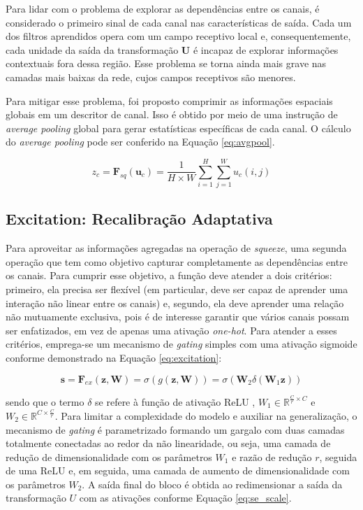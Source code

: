 Para lidar com o problema de explorar as dependências entre os canais, é considerado o primeiro sinal de cada canal nas características de saída. Cada um dos filtros aprendidos opera com um campo receptivo local e, consequentemente, cada unidade da saída da transformação $\mathbf{U}$ é incapaz de explorar informações contextuais fora dessa região. Esse problema se torna ainda mais grave nas camadas mais baixas da rede, cujos campos receptivos são menores.

Para mitigar esse problema, foi proposto comprimir as informações espaciais globais em um descritor de canal. Isso é obtido por meio de uma instrução de \textit{average pooling} global para gerar estatísticas específicas de cada canal. O cálculo do \textit{average pooling} pode ser conferido na Equação \ref{eq:avgpool}.

\begin{equation}
z_c = \mathbf{F}_{sq}(\mathbf{u}_c) = \frac{1}{H \times W} \sum_{i=1}^{H} \sum_{j=1}^{W} u_c(i, j)
\label{eq:avgpool}
\end{equation}

\subsection{Excitation: Recalibração Adaptativa}
\label{subsec:excitation}

Para aproveitar as informações agregadas na operação de \textit{squeeze}, uma segunda operação que tem como objetivo capturar completamente as dependências entre os canais. Para cumprir esse objetivo, a função deve atender a dois critérios: primeiro, ela precisa ser flexível (em particular, deve ser capaz de aprender uma interação não linear entre os canais) e, segundo, ela deve aprender uma relação não mutuamente exclusiva, pois é de interesse garantir que vários canais possam ser enfatizados, em vez de apenas uma ativação \textit{one-hot}. Para atender a esses critérios, emprega-se um mecanismo de \textit{gating} simples com uma ativação sigmoide conforme demonstrado na Equação \ref{eq:excitation}:

\begin{equation}
\mathbf{s} = \mathbf{F}_{ex}(\mathbf{z}, \mathbf{W}) = \sigma(g(\mathbf{z}, \mathbf{W})) = \sigma(\mathbf{W}_2 \delta(\mathbf{W}_1 \mathbf{z}))
\label{eq:excitation}
\end{equation}

\noindent sendo que o termo $\delta$ se refere à função de ativação ReLU \cite{nairRectifiedLinearUnits}, $W_1 \in \mathbb{R}^{\frac{C}{r} \times C}$ e $W_2 \in \mathbb{R}^{C \times \frac{C}{r}}$. Para limitar a complexidade do modelo e auxiliar na generalização, o mecanismo de \textit{gating} é parametrizado formando um gargalo com duas camadas totalmente conectadas ao redor da não linearidade, ou seja, uma camada de redução de dimensionalidade com os parâmetros $W_1$ e razão de redução $r$, seguida de uma ReLU e, em seguida, uma camada de aumento de dimensionalidade com os parâmetros $W_2$. A saída final do bloco é obtida ao redimensionar a saída da transformação $U$ com as ativações conforme Equação \ref{eq:se_scale}.

